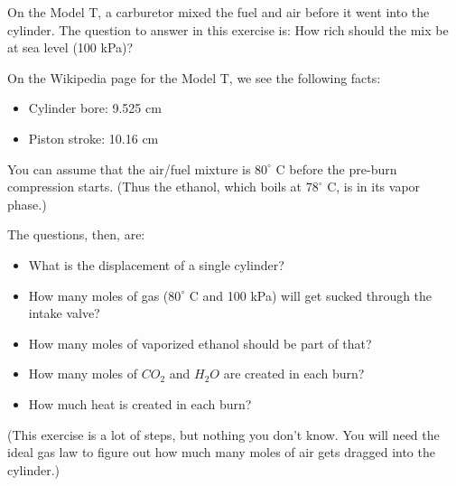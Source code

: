 \begin{Exercise}[title={Fuel Mix for the Model T},  label=fuelmix]

On the Model T, a carburetor mixed the fuel and air before it went into the cylinder.   The question to answer in this exercise is: How rich should the mix be at sea level (100 kPa)?

On the Wikipedia page for the Model T,  we see the following facts:
\begin{itemize}
\item Cylinder bore: 9.525 cm
\item Piston stroke: 10.16 cm
\end{itemize}

You can assume that the air/fuel mixture is $80^\circ$ C before the pre-burn compression starts.  (Thus the ethanol,  which boils at $78^\circ$ C, is in its vapor phase.)

The questions, then, are:

\begin{itemize}
\item What is the displacement of a single cylinder?
\item How many moles of gas ($80^\circ$ C and 100 kPa) will get sucked through the intake valve?
\item How many moles of vaporized ethanol should be part of that?
\item How many moles of $CO_2$  and  $H_2O$ are created in each burn?
\item How much heat is created in each burn?
\end{itemize}

(This exercise is a lot of steps, but nothing you don't know.  You will need the ideal gas law to figure out how much many moles of air gets dragged into the cylinder.)

\end{Exercise}

